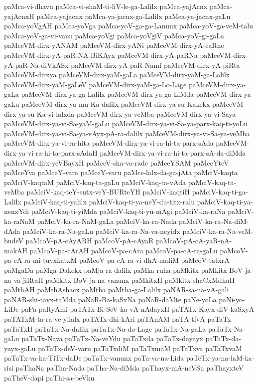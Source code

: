 {paMca-vi-dhavu
paMca-vi-shaM-ti-liV-le-ga-Lalilx
paMca-yajAcnx
paMca-yajAcnxH
paMca-yajacnx
paMca-ya-jacnx-ga-Lalilx
paMca-ya-jacnx-gaLu
paMca-yoVgAH
paMca-yoVga
paMca-yoV-ga-ga-Lanunx
paMca-yoV-ga-veM-talu
paMca-yoV-ga-vi-vanu
paMca-yoVgi
paMca-yoVgiV
paMca-yoV-gi-gaLa
paMceVM-dirx-yANAM
paMceVM-dirx-yANi
paMceVM-dirx-yA-caRne
paMceVM-dirx-yA-paR-NA-BiKAyx
paMceVM-dirx-yA-paRNa
paMceVM-dirx-yA-paR-Na-diVkASx
paMceVM-dirx-yA-paR-Namf
paMceVM-dirx-yA-piRta
paMceVM-dirxya
paMceVM-dirx-yaM-gaLa
paMceVM-dirx-yaM-ga-Lalilx
paMceVM-dirx-yaM-gaLeV
paMceVM-dirx-yaM-ga-Lo-Lage
paMceVM-dirx-ya-gaLa
paMceVM-dirx-ya-ga-Lalilx
paMceVM-dirx-ya-ga-LiMda
paMceVM-dirx-ya-gaLu
paMceVM-dirx-ya-mu-Ka-dalilx
paMceVM-dirx-ya-su-Kakekx
paMceVM-dirx-ya-su-Ka-vi-lalxda
paMceVM-dirx-ya-veMba
paMceVM-dirx-ya-vi-Saya
paMceVM-dirx-ya-vi-Sa-yaM-gaLu
paMceVM-dirx-ya-vi-Sa-ya-parx-kaq-ti-yoLu
paMceVM-dirx-ya-vi-Sa-ya-vAyx-pA-ra-dalilx
paMceVM-dirx-ya-vi-Sa-ya-veMba
paMceVM-dirx-ya-vi-ra-hita
paMceVM-dirx-ya-vi-ra-hi-ta-parx-sAda
paMceVM-dirx-ya-vi-ra-hi-ta-parx-sAdaH
paMceVM-dirx-ya-vi-ra-hi-ta-parx-sA-da-diMda
paMceVM-dirx-yeVBayxH
paMceV-sha-va-rade
paMceYSAM
paMceYteV
paMceYva
paMceY-vara
paMceY-varu
paMce-lalx-da-ga-jAta
paMciV-kaqta
paMciV-kaqtaM
paMciV-kaq-ta-gaLu
paMciV-kaq-ta-vAda
paMciV-kaq-ta-veMba
paMciV-kaq-teY-sutx-veY-BURteYH
paMciV-kaqtiH
paMciV-kaq-ti-ga-Lalilx
paMciV-kaq-ti-yalilx
paMciV-kaq-ti-ya-neY-du-titx-ralu
paMciV-kaq-ti-ya-nenxYdi
paMciV-kaq-ti-yiMda
paMciV-kaq-ti-yu-mAgi
paMciV-ka-raNa
paMciV-ka-raNaM
paMciV-ka-ra-NaM-gaLa
paMciV-ka-ra-Nada
paMciV-ka-ra-Na-diM-dAda
paMciV-ka-ra-Na-gaLu
paMciV-ka-ra-Na-va-neyidx
paMciV-ka-ra-Na-veM-budeV
paMcoV-pA-cAyARH
paMcoV-pA-cAyaR
paMcoV-pA-cA-yaR-nA-makAH
paMcoV-pa-cArAH
paMcoV-pa-cAra
paMcoV-pa-cA-ra-gaLu
paMcoV-pa-cA-ra-mi-tuyxkatxM
paMcoV-pa-cA-ra-vi-dhA-nadiM
paMcoV-tatxrA
paMgaDa
paMga-Dakekx
paMja-ra-dalilx
paMka-ruha
paMkitx
paMkitx-BoV-ja-na-va-jiRtaH
paMkitx-BoV-ja-na-vanunx
paMkitxH
paMkitx-shaCxMdhaH
paMthAH
paMthAshacx
paMtha
paMtha-ga-Lalilx
paNAR-sa-na-vA-gali
paNAR-shi-tavx-taMda
paNaR-Ba-kaSxNa
paNaR-daMte
paNe-yoLa
paNi-yo-LiDe
paPa
paRyAmi
paTATx-Bi-SeV-ka-vA-nAdayxH
paTATx-Kayx-diV-kaSxyA
paTATxM-ta-ra-ve-yilalx
paTATx-dhi-kAri
paTAnAM
paTA-tfvA
paTaTx
paTaTxH
paTaTx-Na-dalilx
paTaTx-Na-do-Lage
paTaTx-Na-gaLa
paTaTx-Na-gaLu
paTaTx-Nava
paTaTx-Na-veYdu
paTaTxda
paTaTx-dayayx
paTaTx-da-yayx-gaLu
paTaTx-deV-varu
paTaTxdiM
paTaTxmaM
paTaTxva
paTaTxvaM
paTaTx-va-ka-TiTx-daDe
paTaTx-vanunx
paTa-va-na-Lida
paTeTx-ya-na-laM-ka-risi
paThaNa
paTha-Nada
paTha-Na-diMda
paThayx-mA-neVSu
paThayxteV
paTheV-dapi
paThi-sa-beVku
}
